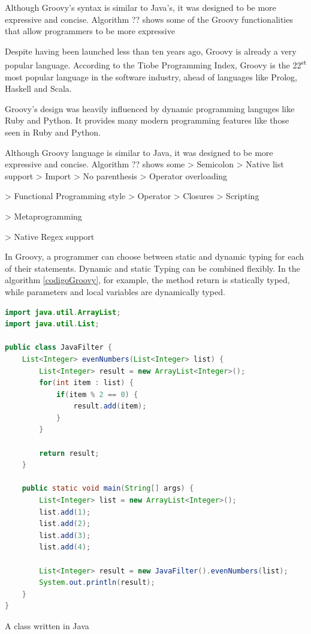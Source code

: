 \documentclass[preprint]{sigplanconf}
\begin{document}
Although Groovy's syntax is similar to Java's, it was designed to be more expressive and concise. Algorithm ?? shows some of the Groovy functionalities that allow programmers to be more expressive

Despite having been launched less than ten years ago, Groovy is already a very popular language.
According to the Tiobe Programming Index, Groovy is the 22\textsuperscript{st} most popular language in the software industry\cite{tiobe}, ahead of languages like Prolog, Haskell and Scala. 

Groovy's design was heavily influenced by dynamic programming languges like Ruby and Python.
It provides many modern programming features like those seen in Ruby and Python.


Although Groovy language is similar to Java, it was designed to be more expressive and concise. Algorithm ?? shows some 
> Semicolon
> Native list support 
> Import
> No parenthesis
> Operator overloading


> Functional Programming style 
> Operator
> Closures 
> Scripting 

> Metaprogramming 

> Native Regex support 


In Groovy, a programmer can choose between static and dynamic typing for each of their statements. Dynamic and static Typing can be combined flexibly. In the algorithm \ref{codigoGroovy}, for example, the method return is statically typed, while parameters and local variables are dynamically typed.

\begin{Listing}[ht]
\begin{lstlisting}[language=Java,tabsize=2,breaklines=true]
import java.util.ArrayList;
import java.util.List;

public class JavaFilter {
	List<Integer> evenNumbers(List<Integer> list) {
		List<Integer> result = new ArrayList<Integer>();
		for(int item : list) {
			if(item % 2 == 0) {
				result.add(item);
			}
		}

		return result;
	}

	public static void main(String[] args) {
		List<Integer> list = new ArrayList<Integer>();
		list.add(1);
		list.add(2);
		list.add(3);
		list.add(4);

		List<Integer> result = new JavaFilter().evenNumbers(list);
		System.out.println(result);
	}
}
\end{lstlisting}
\caption{A class written in Java}
\label{codigoGroovy}
\end{Listing}
\end{document}
